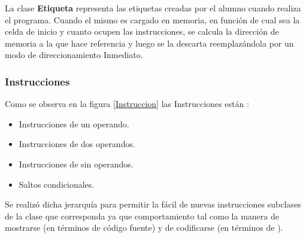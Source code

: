 La clase \textbf{Etiqueta} representa las etiquetas creadas por el alumno cuando realiza el programa. Cuando el mismo es cargado en memoria, en función de cual sea la celda de inicio y cuanto ocupen las instrucciones, se calcula la dirección de memoria a la que hace referencia y luego se la descarta reemplazándola por un modo de direccionamiento Inmediato.


\subsubsection{Instrucciones}
Como se observa en la figura \ref{Instruccion} las Instrucciones están :

\begin{itemize}
\item Instrucciones de un operando.
\item Instrucciones de dos operandos.
\item Instrucciones de sin operandos.
\item Saltos condicionales.
\end{itemize}

Se realizó dicha jerarquía para permitir la fácil  de nuevas instrucciones  subclases de la clase que corresponda ya que  comportamiento tal como la manera de mostrarse (en términos de código fuente) y de codificarse (en términos de \codmaq).


